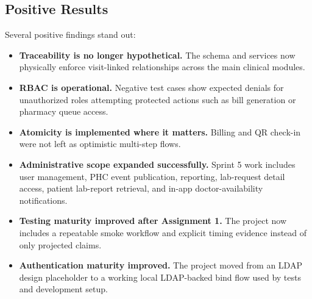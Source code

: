 \documentclass[conference]{IEEEtran}
\begin{document}
\subsection{Positive Results}
Several positive findings stand out:
\begin{itemize}
    \item \textbf{Traceability is no longer hypothetical.} The schema and services now physically enforce visit-linked relationships across the main clinical modules.
    \item \textbf{RBAC is operational.} Negative test cases show expected denials for unauthorized roles attempting protected actions such as bill generation or pharmacy queue access.
    \item \textbf{Atomicity is implemented where it matters.} Billing and QR check-in were not left as optimistic multi-step flows.
    \item \textbf{Administrative scope expanded successfully.} Sprint 5 work includes user management, PHC event publication, reporting, lab-request detail access, patient lab-report retrieval, and in-app doctor-availability notifications.
    \item \textbf{Testing maturity improved after Assignment 1.} The project now includes a repeatable smoke workflow and explicit timing evidence instead of only projected claims.
    \item \textbf{Authentication maturity improved.} The project moved from an LDAP design placeholder to a working local LDAP-backed bind flow used by tests and development setup.
\end{itemize}
\end{document}
